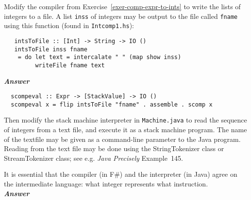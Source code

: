 \documentclass[a4paper]{article}
\begin{document}
\begin{exercise}\label{exer-read-ints-into-stack-machine}
  Modify the compiler from Exercise~\ref{exer-comp-expr-to-ints} to
  write the lists of integers to a file.  A list \texttt{inss} of
  integers may be output to the file called \texttt{fname} using this
  function (found in \texttt{Intcomp1.hs}):

{\codesetup\begin{verbatim}
   intsToFile :: [Int] -> String -> IO ()
   intsToFile inss fname 
    = do let text = intercalate " " (map show inss)
         writeFile fname text
\end{verbatim}}
\noindent
\textbf{\emph{Answer}}
  {\codesetup\begin{verbatim}
  scompeval :: Expr -> [StackValue] -> IO ()
  scompeval x = flip intsToFile "fname" . assemble . scomp x
  \end{verbatim}}

\noindent
Then modify the stack machine interpreter in \texttt{Machine.java} to
read the sequence of integers from a text file, and execute it as a
stack machine program.  The name of the textfile may be given as a
command-line parameter to the Java program.  Reading from the text
file may be done using the StringTokenizer class or StreamTokenizer
class; see e.g. \emph{Java Precisely} Example~145.
  
It is essential that the compiler (in F\#) and the interpreter (in
Java) agree on the intermediate language: what integer represents what
instruction.\\

\noindent
\textbf{\emph{Answer }}
{\color{red}{This second part of the exercise requires the student to modify the file Machine.java, so I haven't translated this answer.}} 
\end{exercise}
\end{document}
